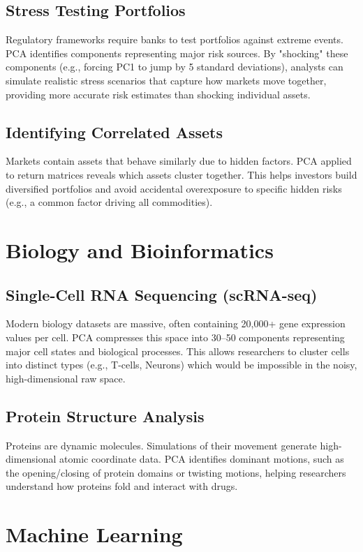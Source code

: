 \documentclass[12pt, a4paper]{report}
\begin{document}
\subsection{Stress Testing Portfolios}
Regulatory frameworks require banks to test portfolios against extreme events. PCA identifies components representing major risk sources. By "shocking" these components (e.g., forcing PC1 to jump by 5 standard deviations), analysts can simulate realistic stress scenarios that capture how markets move together, providing more accurate risk estimates than shocking individual assets.

\subsection{Identifying Correlated Assets}
Markets contain assets that behave similarly due to hidden factors. PCA applied to return matrices reveals which assets cluster together. This helps investors build diversified portfolios and avoid accidental overexposure to specific hidden risks (e.g., a common factor driving all commodities).

\section{Biology and Bioinformatics}

\subsection{Single-Cell RNA Sequencing (scRNA-seq)}
Modern biology datasets are massive, often containing 20,000+ gene expression values per cell. PCA compresses this space into 30–50 components representing major cell states and biological processes. This allows researchers to cluster cells into distinct types (e.g., T-cells, Neurons) which would be impossible in the noisy, high-dimensional raw space.

\subsection{Protein Structure Analysis}
Proteins are dynamic molecules. Simulations of their movement generate high-dimensional atomic coordinate data. PCA identifies dominant motions, such as the opening/closing of protein domains or twisting motions, helping researchers understand how proteins fold and interact with drugs.

\section{Machine Learning}
\end{document}

